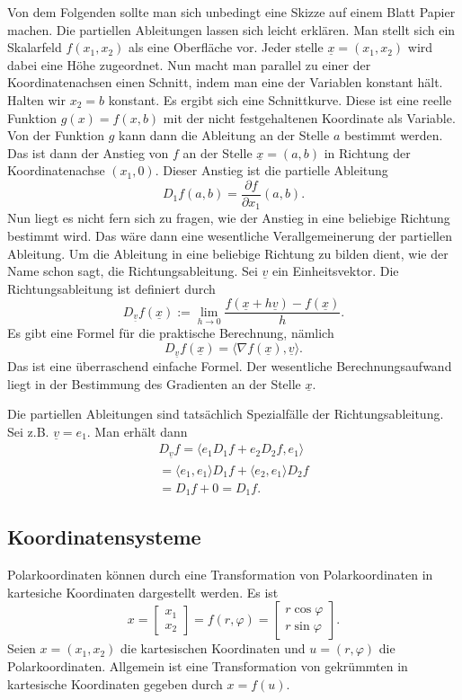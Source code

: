 \documentclass[a4paper,10pt,fleqn,twocolumn,twoside]{article}
\begin{document}
Von dem Folgenden sollte man sich unbedingt eine Skizze auf einem
Blatt Papier machen. Die partiellen Ableitungen lassen sich leicht
erklären. Man stellt sich ein Skalarfeld \(f(x_1,x_2)\) als eine
Oberfläche vor. Jeder stelle \(\underline x=(x_1,x_2)\) wird dabei
eine Höhe zugeordnet. Nun macht man parallel zu einer der
Koordinatenachsen einen Schnitt, indem man eine der Variablen
konstant hält. Halten wir \(x_2=b\) konstant. Es ergibt sich
eine Schnittkurve. Diese ist eine reelle Funktion \(g(x)=f(x,b)\)
mit der nicht festgehaltenen Koordinate als Variable.
Von der Funktion \(g\) kann dann die Ableitung an der Stelle \(a\)
bestimmt werden. Das ist dann der Anstieg von \(f\) an der Stelle
\(\underline x=(a,b)\) in Richtung der Koordinatenachse \((x_1,0)\).
Dieser Anstieg ist die partielle Ableitung
\[D_1 f(a,b) = \frac{\partial f}{\partial x_1}(a,b).\]
%
Nun liegt es nicht fern sich zu fragen, wie der Anstieg in eine
beliebige Richtung bestimmt wird. Das wäre dann eine wesentliche
Verallgemeinerung der partiellen Ableitung.
%
Um die Ableitung in eine beliebige Richtung zu bilden dient, wie der
Name schon sagt, die Richtungsableitung. Sei \(\underline v\)
ein Einheitsvektor. Die Richtungsableitung ist definiert durch
\[D_{\underline v} f(\underline x) := \lim_{h\rightarrow 0}
\frac{f(\underline x+h\underline v)-f(\underline x)}{h}.\]
Es gibt eine Formel für die praktische Berechnung, nämlich
\[D_{\underline v} f(\underline x)
= \langle\nabla f(\underline x),\underline v\rangle.\]
Das ist eine überraschend einfache Formel. Der wesentliche
Berechnungsaufwand liegt in der Bestimmung des Gradienten
an der Stelle \(\underline x\).

Die partiellen Ableitungen sind tatsächlich Spezialfälle der
Richtungsableitung. Sei z.B. \(\underline v=e_1\). Man erhält dann
\begin{gather*}
D_{\underline v} f
= \langle e_1 D_1f+e_2 D_2 f, e_1\rangle\\
= \langle e_1, e_1\rangle D_1f  + \langle e_2, e_1\rangle D_2 f\\
= D_1f+0 = D_1f.
\end{gather*}

\subsection{Koordinatensysteme}

Polarkoordinaten können durch eine Transformation von
Polarkoordinaten in kartesiche Koordinaten dargestellt werden.
Es ist
\[x = \begin{bmatrix}
x_1\\ x_2 \end{bmatrix}
= f(r,\varphi) = \begin{bmatrix}
r\cos\varphi\\
r\sin\varphi
\end{bmatrix}.\]
Seien \(x=(x_1,x_2)\) die kartesischen Koordinaten und
\(u=(r,\varphi)\) die Polarkoordinaten. Allgemein ist eine
Transformation von gekrümmten in kartesische Koordinaten gegeben durch
\(x=f(u).\)
\end{document}

